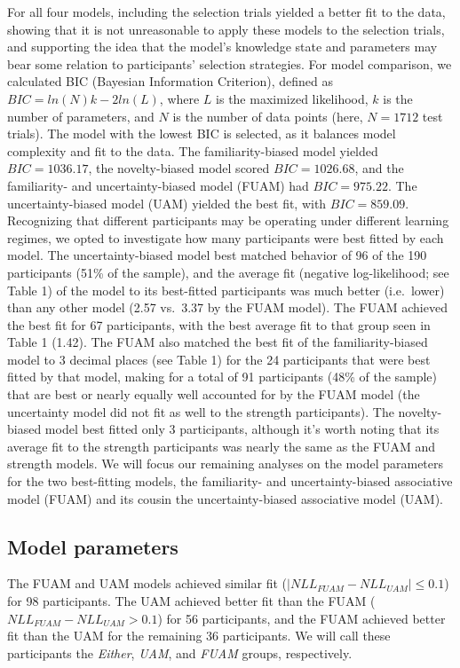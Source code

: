 \documentclass[10pt, letterpaper]{article}
\begin{document}
For all four models, including the selection trials yielded a better fit
to the data, showing that it is not unreasonable to apply these models
to the selection trials, and supporting the idea that the model's
knowledge state and parameters may bear some relation to participants'
selection strategies. For model comparison, we calculated BIC (Bayesian
Information Criterion), defined as \(BIC=ln(N)k-2ln(L)\), where \(L\) is
the maximized likelihood, \(k\) is the number of parameters, and \(N\)
is the number of data points (here, \(N=1712\) test trials). The model
with the lowest BIC is selected, as it balances model complexity and fit
to the data. The familiarity-biased model yielded \(BIC = 1036.17\), the
novelty-biased model scored \(BIC = 1026.68\), and the familiarity- and
uncertainty-biased model (FUAM) had \(BIC = 975.22\). The
uncertainty-biased model (UAM) yielded the best fit, with
\(BIC = 859.09\). Recognizing that different participants may be
operating under different learning regimes, we opted to investigate how
many participants were best fitted by each model. The uncertainty-biased
model best matched behavior of 96 of the 190 participants (51\% of the
sample), and the average fit (negative log-likelihood; see Table 1) of
the model to its best-fitted participants was much better (i.e.~lower)
than any other model (2.57 vs.~3.37 by the FUAM model). The FUAM
achieved the best fit for 67 participants, with the best average fit to
that group seen in Table 1 (1.42). The FUAM also matched the best fit of
the familiarity-biased model to 3 decimal places (see Table 1) for the
24 participants that were best fitted by that model, making for a total
of 91 participants (48\% of the sample) that are best or nearly equally
well accounted for by the FUAM model (the uncertainty model did not fit
as well to the strength participants). The novelty-biased model best
fitted only 3 participants, although it's worth noting that its average
fit to the strength participants was nearly the same as the FUAM and
strength models. We will focus our remaining analyses on the model
parameters for the two best-fitting models, the familiarity- and
uncertainty-biased associative model (FUAM) and its cousin the
uncertainty-biased associative model (UAM).

\subsection{Model parameters}\label{model-parameters}

The FUAM and UAM models achieved similar fit
(\(|NLL_{FUAM} - NLL_{UAM}| \leq 0.1\)) for 98 participants. The UAM
achieved better fit than the FUAM (\(NLL_{FUAM} - NLL_{UAM} > 0.1\)) for
56 participants, and the FUAM achieved better fit than the UAM for the
remaining 36 participants. We will call these participants the
\emph{Either}, \emph{UAM}, and \emph{FUAM} groups, respectively.
\end{document}
